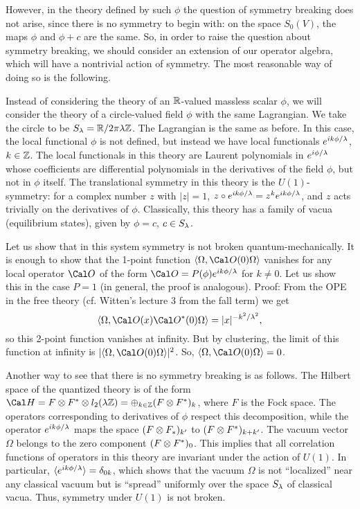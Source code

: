 However, in the theory defined by such $\phi$ the question of symmetry breaking
does not arise, since there is no symmetry to begin with: on the space
$S_0(V)$, the maps $\phi$ and $\phi+c$ are the same. So, in order
to raise the question about symmetry breaking, 
we should consider an extension of our operator algebra,
which will have a nontrivial action of symmetry. 
The most reasonable way of doing so is the following.

Instead of considering the theory of an $\Bbb R$-valued massless scalar
$\phi$, we will consider the theory of a circle-valued field $\phi$
with the same Lagrangian. We take the circle to be $S_\lambda=\Bbb R/2\pi\lambda \Bbb Z$. 
The Lagrangian is the same as before. In this case, the local functional 
$\phi$ is not defined, but instead we have local functionals
$e^{ik\phi/\lambda}$, $k\in\Bbb Z$. The local functionals in this theory 
are Laurent polynomials in $e^{i\phi/\lambda}$ whose coefficients 
are differential polynomials 
in the derivatives of the field $\phi$, but not in $\phi$ itself.
The translational symmetry in this theory is the $U(1)$-symmetry:
for a complex number $z$ with $|z|=1$,
$z\circ e^{ik\phi/\lambda}=z^ke^{ik\phi/\lambda}$, and 
$z$ acts trivially on the derivatives of $\phi$. 
Classically, this theory has a family of vacua (equilibrium states),
given by $\phi=c$, $c\in S_\lambda$. 

Let us show that in this system symmetry is not broken
quantum-mechanically. It is enough to show that the 1-point function 
$\<\Omega,\O(0)\Omega\>$ vanishes for any local operator $\O$ of
the form $\O=P(\phi)e^{ik\phi/\l}$ for $k\ne 0$. Let us show this 
in the case $P=1$ (in general, the proof is analogous). Proof: 
{}From the OPE in the free theory 
(cf. Witten's lecture 3 from the fall term) we get 
$$
\<\Omega,\O(x)\O^*(0)\Omega\>=|x|^{-k^2/\l^2},
$$
so this 2-point function vanishes at infinity. 
But by clustering, the limit of this function at infinity
is $|\<\Omega,\O(0)\Omega\>|^2$. So, $\<\Omega,\O(0)\Omega\>=0$. 
 
Another way to see that there is no symmetry breaking is as follows. 
The Hilbert space of the quantized theory is of the form 
$\Cal H=F\o F^*\o l_2(\l\Z)=\oplus_{k\in\Z}(F\o F^*)_k$, 
where $F$ is the Fock space. 
The operators corresponding to derivatives of
$\phi$ respect this decomposition, while the operator $e^{ik\phi/\lambda}$
maps the space $(F\otimes F_*)_{k'}$ to $(F\otimes F^*)_{k+k'}$. 
The vacuum vector $\Omega$ belongs to the zero
component $(F\otimes F^*)_0$. This implies that all correlation 
functions of operators in this theory are invariant under the action
of $U(1)$. In particular, $\langle e^{ik\phi/\lambda}\rangle=\delta_{0k}$,
which shows that the vacuum $\Omega$ is not ``localized'' near any
classical vacuum but is ``spread'' uniformly over the space $S_\lambda$ of
classical vacua. Thus, symmetry under $U(1)$ is not broken. 

